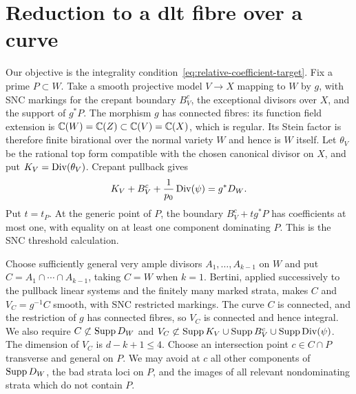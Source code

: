 \section{Reduction to a dlt fibre over a curve}
\label{sec:curve}

Our objective is the integrality condition~\eqref{eq:relative-coefficient-target}.
Fix a prime $P\subset W$.  Take a smooth projective model $V\to X$ mapping
to $W$ by $g$, with SNC markings for the crepant boundary $B_V^c$, the
exceptional divisors over $X$, and the support of $g^*P$.
The morphism $g$ has connected fibres: its function field extension is
$\mathbb C(W)=\mathbb C(Z)\subset\mathbb C(V)=\mathbb C(X)$, which is regular. Its Stein
factor is therefore finite birational over the normal variety $W$ and
hence is $W$ itself.  Let $\theta_V$ be the rational top form compatible
with the chosen canonical divisor on $X$, and put $K_V=\operatorname{Div}(\theta_V)$.
Crepant pullback gives
\begin{equation}\label{eq:relative-resolution-presentation}
 K_V+B_V^c+\frac1{p_0}\operatorname{Div}(\psi)=g^*D_W.
\end{equation}
Put $t=t_P$.  At the generic point of $P$, the boundary
$B_V^c+t g^*P$ has coefficients at most one, with equality on at least one
component dominating $P$.  This is the SNC threshold calculation.

Choose sufficiently general very ample divisors $A_1,\ldots,A_{k-1}$ on
$W$ and put $C=A_1\cap\cdots\cap A_{k-1}$, taking $C=W$ when $k=1$.
Bertini, applied successively to the pullback linear systems and the
finitely many marked strata, makes $C$ and $V_C=g^{-1}C$ smooth, with
SNC restricted markings.  The curve $C$ is connected, and the restriction
of $g$ has connected fibres, so $V_C$ is connected and hence integral.
We also require $C\not\subset\operatorname{Supp} D_W$ and
$V_C\not\subset\operatorname{Supp} K_V\cup\operatorname{Supp} B_V^c\cup\operatorname{Supp}\operatorname{Div}(\psi)$.
The dimension of $V_C$ is $d-k+1\leq4$.  Choose an intersection point
$c\in C\cap P$ transverse and general on $P$.  We may avoid at $c$ all
other components of $\operatorname{Supp} D_W$, the bad strata loci on $P$, and the
images of all relevant nondominating strata which do not contain $P$.

